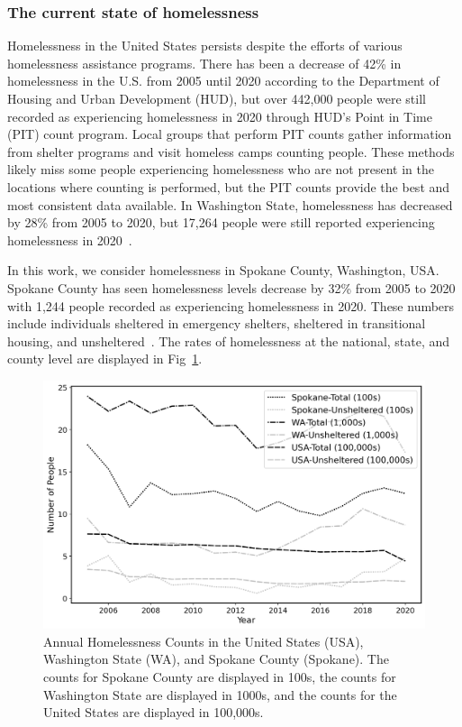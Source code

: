 \documentclass[10pt,letterpaper]{article}
\begin{document}
\subsubsection*{The current state of homelessness}
Homelessness in the United States persists despite the efforts of various homelessness assistance programs. There has been a decrease of 42\% in homelessness in the U.S. from 2005 until 2020 according to the Department of Housing and Urban Development (HUD), but over 442,000 people were still recorded as experiencing homelessness in 2020 through HUD's Point in Time (PIT) count program. Local groups that perform PIT counts gather information from shelter programs and visit homeless camps counting people. These methods likely miss some people experiencing homelessness who are not present in the locations where counting is performed, but the PIT counts provide the best and most consistent data available. In Washington State, homelessness has decreased by 28\% from 2005 to 2020, but 17,264 people were still reported experiencing homelessness in 2020~\cite{PITcount}.

In this work, we consider homelessness in Spokane County, Washington, USA.  Spokane County has seen  homelessness levels decrease by 32\% from 2005 to 2020 with 1,244 people recorded as experiencing homelessness in 2020. These numbers include individuals sheltered in emergency shelters, sheltered in transitional housing, and unsheltered~\cite{PITcount}. The rates of homelessness at the national, state, and county level are displayed in Fig~\ref{fig:homelessness_counts}.

\begin{figure}[!h]
    \centering
    \includegraphics[width=\textwidth]{homelessness_all.png}
    \caption{Annual Homelessness Counts in the United States (USA), Washington State (WA), and Spokane County (Spokane). The counts for Spokane County are displayed in 100s, the counts for Washington State are displayed in 1000s, and the counts for the United States are displayed in 100,000s.~\cite{PITcount}}
    \label{fig:homelessness_counts}
\end{figure}
\end{document}
